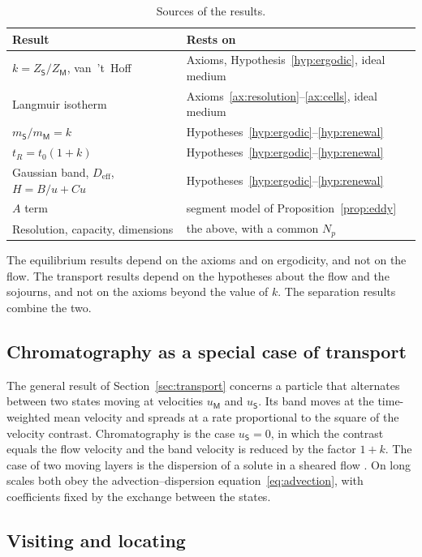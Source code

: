 \documentclass[11pt,a4paper]{article}
\theoremstyle{definition}
\theoremstyle{remark}
\newcommand{\Mob}{\mathsf{M}}
\newcommand{\Sta}{\mathsf{S}}
\begin{document}
\begin{table}[ht]
\centering
\caption{Sources of the results.}
\label{tab:sources}
\begin{tabular}{@{}ll@{}}
\toprule
Result & Rests on \\
\midrule
$k=Z_\Sta/Z_\Mob$, van~'t~Hoff & Axioms, Hypothesis~\ref{hyp:ergodic}, ideal medium \\
Langmuir isotherm & Axioms~\ref{ax:resolution}--\ref{ax:cells}, ideal medium \\
$m_\Sta/m_\Mob=k$ & Hypotheses~\ref{hyp:ergodic}--\ref{hyp:renewal} \\
$t_R=t_0(1+k)$ & Hypotheses~\ref{hyp:ergodic}--\ref{hyp:renewal} \\
Gaussian band, $D_{\mathrm{eff}}$, $H=B/u+Cu$ & Hypotheses~\ref{hyp:ergodic}--\ref{hyp:renewal} \\
$A$ term & segment model of Proposition~\ref{prop:eddy} \\
Resolution, capacity, dimensions & the above, with a common $N_p$ \\
\bottomrule
\end{tabular}
\end{table}

The equilibrium results depend on the axioms and on ergodicity, and not on the flow.
The transport results depend on the hypotheses about the flow and the sojourns, and not on the axioms beyond the value of $k$.
The separation results combine the two.

\subsection{Chromatography as a special case of transport}

The general result of Section~\ref{sec:transport} concerns a particle that alternates between two states moving at velocities $u_\Mob$ and $u_\Sta$.
Its band moves at the time-weighted mean velocity and spreads at a rate proportional to the square of the velocity contrast.
Chromatography is the case $u_\Sta=0$, in which the contrast equals the flow velocity and the band velocity is reduced by the factor $1+k$.
The case of two moving layers is the dispersion of a solute in a sheared flow \citep{taylor1953,aris1956}.
On long scales both obey the advection--dispersion equation~\eqref{eq:advection}, with coefficients fixed by the exchange between the states.

\subsection{Visiting and locating}
\end{document}
